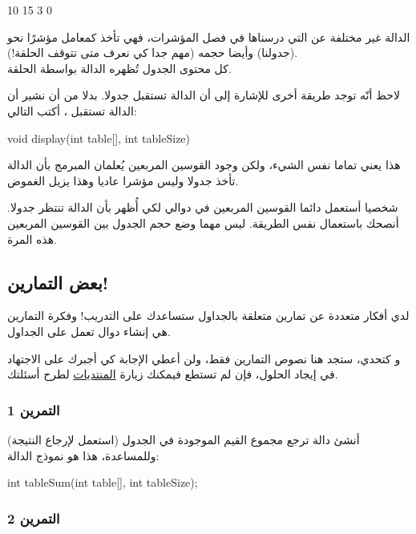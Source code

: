 \begin{Console}
10
15
3
0
\end{Console}

الدالة غير مختلفة عن التي درسناها في فصل المؤشرات، فهي تأخذ كمعامل مؤشرًا نحو
(جدولنا) وأيضا حجمه (مهم جدا كي نعرف متى تتوقف الحلقة!).\\
كل محتوى الجدول تُظهره الدالة بواسطة الحلقة.

لاحظ أنّه توجد طريقة أخرى للإشارة إلى أن الدالة تستقبل جدولا. بدلا من أن نشير أن الدالة تستقبل
،
أكتب التالي:

\begin{Csource}
void display(int table[], int tableSize)
\end{Csource}

هذا يعني تماما نفس الشيء، ولكن وجود القوسين المربعين يُعلمان المبرمج بأن الدالة تأخذ جدولا وليس مؤشرا عاديا وهذا يزيل الغموض.

شخصيا أستعمل دائما القوسين المربعين في دوالي لكي أُظهر بأن الدالة تنتظر جدولا. أنصحك باستعمال نفس الطريقة. ليس مهما وضع حجم الجدول بين القوسين المربعين هذه المرة.

\subsection{بعض التمارين!}

لدي أفكار متعددة عن تمارين متعلقة بالجداول ستساعدك على التدريب! وفكرة التمارين هي إنشاء دوال تعمل على الجداول.

و كتحدي، ستجد هنا نصوص  التمارين فقط، ولن أعطي الإجابة كي أجبرك على الاجتهاد في إيجاد الحلول، فإن لم تستطع فيمكنك زيارة 
\href{http://www.siteduzero.com/forum-81-126-langage-c.html}{المنتديات} 
لطرح أسئلتك.

\subsubsection{التمرين 1}

أنشئ دالة
ترجع مجموع القيم الموجودة في الجدول (استعمل
لإرجاع النتيجة) وللمساعدة، هذا هو نموذج  الدالة:

\begin{Csource}
int tableSum(int table[], int tableSize);
\end{Csource}

\subsubsection{التمرين 2}

